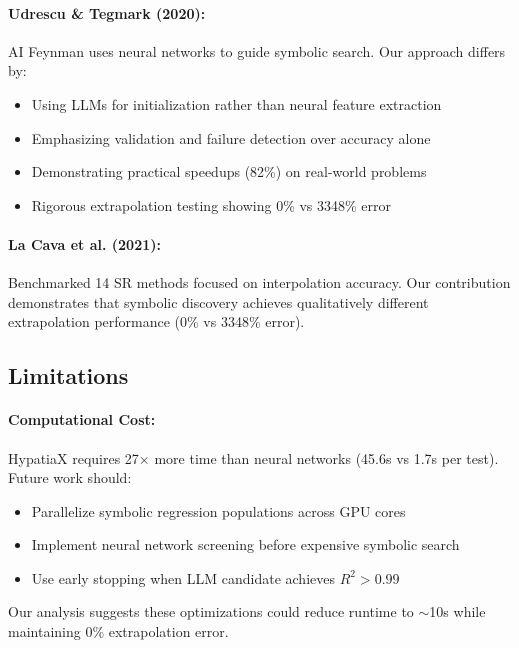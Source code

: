\paragraph{Udrescu \& Tegmark (2020):} AI Feynman uses neural networks to guide symbolic search. Our approach differs by:
\begin{itemize}
\item Using LLMs for initialization rather than neural feature extraction
\item Emphasizing validation and failure detection over accuracy alone
\item Demonstrating practical speedups (82\%) on real-world problems
\item Rigorous extrapolation testing showing 0\% vs 3348\% error
\end{itemize}

\paragraph{La Cava et al. (2021):} Benchmarked 14 SR methods focused on interpolation accuracy. Our contribution demonstrates that symbolic discovery achieves qualitatively different extrapolation performance (0\% vs 3348\% error).


\subsection{Limitations}

\paragraph{Computational Cost:} HypatiaX requires 27$\times$ more time than neural networks (45.6s vs 1.7s per test). Future work should:
\begin{itemize}
\item Parallelize symbolic regression populations across GPU cores
\item Implement neural network screening before expensive symbolic search
\item Use early stopping when LLM candidate achieves $R^2 > 0.99$
\end{itemize}

Our analysis suggests these optimizations could reduce runtime to $\sim$10s while maintaining 0\% extrapolation error.

